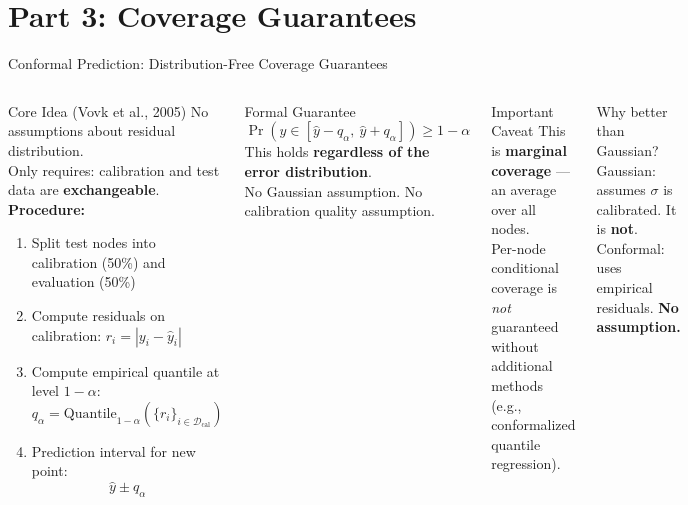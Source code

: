 \documentclass[aspectratio=169,10pt]{beamer}
\newcommand{\emphblue}[1]{\textcolor{tumblue}{\textbf{#1}}}
\newcommand{\emphred}[1]{\textcolor{tumred}{\textbf{#1}}}
\begin{document}
\section{Part 3: Coverage Guarantees}

\begin{frame}{Conformal Prediction: Distribution-Free Coverage Guarantees}
  \begin{columns}[c]
      \begin{block}{Core Idea (Vovk et al., 2005)}
        No assumptions about residual distribution.\\
        Only requires: calibration and test data are \textbf{exchangeable}.\\[0.5em]
        \textbf{Procedure:}
        \begin{enumerate}
          \item Split test nodes into calibration (50\%) and evaluation (50\%)
          \item Compute residuals on calibration: $r_i = |y_i - \hat{y}_i|$
          \item Compute empirical quantile at level $1-\alpha$:
            \[q_\alpha = \text{Quantile}_{1-\alpha}\!\left(\{r_i\}_{i \in \mathcal{D}_\text{cal}}\right)\]
          \item Prediction interval for new point:
            \[\hat{y} \pm q_\alpha\]
        \end{enumerate}
      \end{block}
      \begin{alertblock}{Formal Guarantee}
        \[
          \Pr\!\left(y \in [\hat{y} - q_\alpha,\ \hat{y} + q_\alpha]\right) \geq 1 - \alpha
        \]
        This holds \emphblue{regardless of the error distribution}.\\
        No Gaussian assumption. No calibration quality assumption.
      \end{alertblock}
      \vspace{0.4em}
      \begin{block}{Important Caveat}
        This is \textbf{marginal coverage} — an average over all nodes.\\
        Per-node conditional coverage is \emph{not} guaranteed without additional methods (e.g., conformalized quantile regression).
      \end{block}
      \vspace{0.3em}
      \begin{exampleblock}{Why better than Gaussian?}
        Gaussian: assumes $\sigma$ is calibrated. It is \emphred{not}.\\
        Conformal: uses empirical residuals. \emphblue{No assumption.}
      \end{exampleblock}
  \end{columns}
\end{frame}
\end{document}
